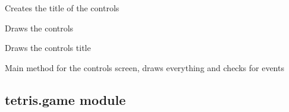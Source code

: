 \documentclass[letterpaper,10pt,english]{sphinxmanual}
\begin{document}
\begin{fulllineitems}
\begin{fulllineitems}
\label{\detokenize{tetris.controls:tetris.controls.Controls.create_title}}
\pysigstartsignatures
{}
\pysigstopsignatures
\sphinxAtStartPar
Creates the title of the controls

\end{fulllineitems}


\begin{fulllineitems}
\label{\detokenize{tetris.controls:tetris.controls.Controls.draw_controls}}
\pysigstartsignatures
{}
\pysigstopsignatures
\sphinxAtStartPar
Draws the controls

\end{fulllineitems}


\begin{fulllineitems}
\label{\detokenize{tetris.controls:tetris.controls.Controls.draw_title}}
\pysigstartsignatures
{}
\pysigstopsignatures
\sphinxAtStartPar
Draws the controls title

\end{fulllineitems}


\begin{fulllineitems}
\label{\detokenize{tetris.controls:tetris.controls.Controls.main}}
\pysigstartsignatures
{}
\pysigstopsignatures
\sphinxAtStartPar
Main method for the controls screen, draws everything and checks for events

\end{fulllineitems}


\end{fulllineitems}


\sphinxstepscope


\subsection{tetris.game module}
\label{\detokenize{tetris.game:module-tetris.game}}\label{\detokenize{tetris.game:tetris-game-module}}\label{\detokenize{tetris.game::doc}}
\end{document}

